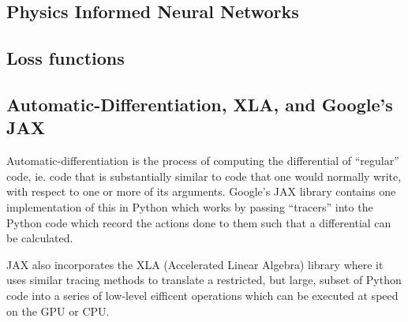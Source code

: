 \documentclass[10pt]{iopart}
\begin{document}
%


\subsection{Physics Informed Neural Networks}
\label{sec:intro-pinn}

\subsection{Loss functions}
\label{sec:intro-lf}





\subsection{Automatic-Differentiation, XLA, and Google's JAX}

Automatic-differentiation is the process of computing the differential of \enquote{regular} code, ie. code that is substantially similar to code that one would normally write, with respect to one or more of its arguments. Google's JAX library \cite{jax2018github} contains one implementation of this in Python which works by passing \enquote{tracers} into the Python code which record the actions done to them such that a differential can be calculated.

JAX also incorporates the XLA (Accelerated Linear Algebra) library \cite{openxla-xla} where it uses similar tracing methods to translate a restricted, but large, subset of Python code into a series of low-level eifficent operations which can be executed at speed on the GPU or CPU.
\end{document}
